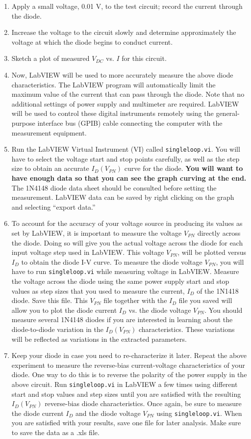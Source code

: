 \documentclass[12pt]{../manual}
\begin{document}
\begin{enumerate}
\item Apply a small voltage, 0.01 V, to the test circuit; record the current through the diode.
\item Increase the voltage to the circuit slowly and determine approximately the voltage at which the diode begins to conduct current.
\item Sketch a plot of measured $V_{DC}$ vs. $I$ for this circuit.
\item Now, LabVIEW will be used to more accurately measure the above diode characteristics. The LabVIEW program will automatically limit the maximum value of the current that can pass through the diode. Note that no additional settings of power supply and multimeter are required. LabVIEW will be used to control these digital instruments remotely using the general-purpose interface bus (GPIB) cable connecting the computer with the measurement equipment.
\item Run the LabVIEW Virtual Instrument (VI) called \texttt{singleloop.vi}. You will have to select the voltage start and stop points carefully, as well as the step size to obtain an accurate $I_D(V_{PN})$ curve for the diode. \textbf{You will want to have enough data so that you can see the graph curving at the end.} The 1N4148 diode data sheet should be consulted before setting the measurement. LabVIEW data can be saved by right clicking on the graph and selecting ``export data.''
\item To account for the accuracy of your voltage source in producing its values as set by LabVIEW, it is important to measure the voltage $V_{PN}$ directly across the diode. Doing so will give you the actual voltage across the diode for each input voltage step used in LabVIEW. This voltage $V_{PN}$, will be plotted versus $I_D$ to obtain the diode I-V curve. To measure the diode voltage $V_{PN}$, you will have to run {\tt singleloop.vi} while measuring voltage in LabVIEW. Measure the voltage across the diode using the same power supply start and stop values as step sizes that you used to measure the current, $I_D$ of the 1N1418 diode. Save this file. This $V_{PN}$ file together with the $I_D$ file you saved will allow you to plot the diode current $I_D$ vs. the diode voltage $V_{PN}$. You should measure several 1N4148 diodes if you are interested in learning about the diode-to-diode variation in the $I_D(V_{PN})$ characteristics. These variations will be reflected as variations in the extracted parameters.
\item Keep your diode in case you need to re-characterize it later. Repeat the above
experiment to measure the reverse-bias current-voltage characteristics of your
diode. One way to do this is to reverse the polarity of the power supply in the
above circuit. Run {\tt singleloop.vi} in LabVIEW a few times using different start
and stop values and step sizes until you are satisfied with the resulting $I_D(V_{PN})$
reverse-bias diode characteristics. Once again, be sure to measure the diode
current $I_D$ and the diode voltage $V_{PN}$ using {\tt singleloop.vi}. When you are
satisfied with your results, save one file for later analysis. Make sure to save the
data as a .xls file.
\end{enumerate}
\end{document}
